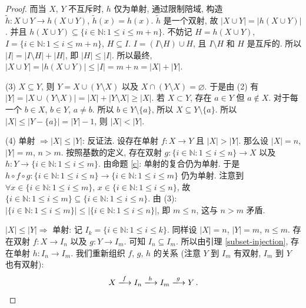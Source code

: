 \documentclass[UTF8]{ctexart}
\theoremstyle{mystyle}
\theoremstyle{myremark}
\theoremstyle{plain}
\newcommand{\N}{\mathbb N}
\newcommand{\set}[1]{\{#1\}}
\begin{document}
\begin{proof}
    而当 $ X $, $ Y $ 不互斥时, $ h $ 仅为单射, 通过限制陪域, 构造 $ \widetilde{h} \colon X \cup Y \to h(X \cup Y) $, $ \widetilde{h} (x) = h(x) $. $ \widetilde{h} $ 是一个双射, 故 $ |X \cup Y| = |h(X \cup Y)| $. 并且 $ h(X \cup Y) \subseteq \set{i \in \N \colon 1 \leqslant i \leqslant m + n} $. 不妨记 $ H = h(X \cup Y) $, $ I = \set{i \in \N \colon 1 \leqslant i \leqslant m + n} $, $ H \subseteq I $. $ I = (I \setminus H) \cup H $, 且 $ I \setminus H $ 和 $ H $ 是互斥的. 所以 $ |I| = |I \setminus H| + |H| $, 即 $ |H| \leqslant |I| $. 所以最终, $ |X \cup Y| = |h(X \cup Y)| \leqslant |I| = m + n = |X| + |Y| $.

    (3) $ X \subseteq Y $, 则 $ Y = X \cup (Y \setminus X) $ 以及 $ X \cap (Y \setminus X) = \varnothing $. 于是由 (2) 有 $ |Y| = |X \cup (Y \setminus X)| = |X| + |Y \setminus X| \geqslant |X| $. 若 $ X \subset Y $, 存在 $ a \in Y $ 但 $ a \notin X $. 对于每一个 $ b \in X $, $ b \in Y $, $ a \neq b $. 所以 $ b \in Y \setminus \set{a} $, 所以 $ X \subseteq Y \setminus \set{a} $. 所以 $ |X| \leqslant |Y - \set{a}| = |Y| - 1 $, 则 $ |X| < |Y| $.

    (4) 单射 $ \Longrightarrow |X| \leqslant |Y| $: 反证法. 设存在单射 $ f \colon X \to Y $ 且 $ |X| > |Y| $. 那么设 $ |X| = n $, $ |Y| = m $, $ n > m $. 按照基数的定义, 存在双射 $ g \colon \set{i \in \N \colon 1 \leqslant i \leqslant n} \to X $ 以及 $ h \colon Y \to \set{i \in \N \colon 1 \leqslant i \leqslant m} $. 由命题 \ref{c}: 单射的复合仍为单射. 于是 $ h \circ f \circ g \colon \set{i \in \N \colon 1 \leqslant i \leqslant n} \to \set{i \in \N \colon 1 \leqslant i \leqslant m} $ 仍为单射. 注意到 $ \forall x \in \set{i \in \N \colon 1 \leqslant i \leqslant m} $, $ x \in \set{i \in \N \colon 1 \leqslant i \leqslant n} $, 故 $ \set{i \in \N \colon 1 \leqslant i \leqslant m} \subseteq \set{i \in \N \colon 1 \leqslant i \leqslant n} $. 由 (3): $ |\set{i \in \N \colon 1 \leqslant i \leqslant m}| \leqslant |\set{i \in \N \colon 1 \leqslant i \leqslant n}| $, 即 $ m \leqslant n $, 这与 $ n > m $ 矛盾.

    $ |X| \leqslant |Y| \Longrightarrow $ 单射: 记 $ I_{k} = \set{i \in \N \colon 1 \leqslant i \leqslant k} $. 同样设 $ |X| = n $, $ |Y| = m $, $ n \leqslant m $. 存在双射 $ f \colon X \to I_n $ 以及 $ g \colon Y \to I_m $. 可知 $ I_n \subseteq I_m $. 所以由引理 \ref{subset-injection}, 存在单射 $ h \colon I_n \to I_m $. 我们重新组织 $ f $, $ g $, $ h $ 的关系 (注意 $ Y $ 到 $ I_m $ 有双射, $ I_m $ 到 $ Y $ 也有双射): \[ X \xlongrightarrow{f} I_n \xlongrightarrow{h} I_m \xlongrightarrow{g} Y \,.\]


\end{proof}
\end{document}
